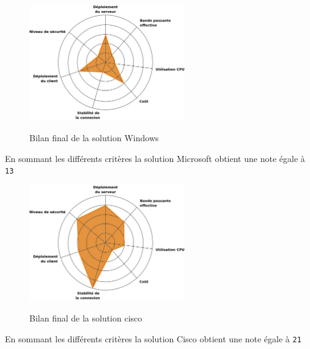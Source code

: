 \begin{figure}[H]
	\begin{center}
		\includegraphics[width=0.6\textwidth]{partie_3/images/windows.png}\\
	\end{center}
	\caption{Bilan final de la solution Windows}
	\label{Graphe Windows}
\end{figure}

En sommant les différents critères la solution Microsoft obtient une note égale à \verb|13|

\begin{figure}[H]
	\begin{center}
		\includegraphics[width=0.6\textwidth]{partie_3/images/cisco.png}\\
	\end{center}
	\caption{Bilan final de la solution cisco}
	\label{Graphe Cisco}
\end{figure}

En sommant les différents critères la solution Cisco obtient une note égale à \verb|21|

